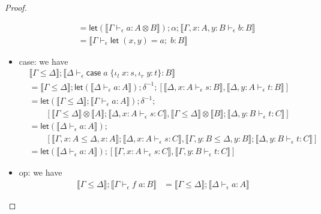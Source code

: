 \documentclass[acmsmall,screen,review]{acmart}
\newcommand{\ms}[1]{\ensuremath{\mathsf{#1}}}
\newcommand{\lto}{:}
\newcommand{\linl}[1]{\iota_l\;{#1}}
\newcommand{\linr}[1]{\iota_r\;{#1}}
\newcommand{\letexpr}[3]{\ensuremath{\ms{let}\;#1 = #2;\;#3}}
\newcommand{\caseexpr}[5]{\ms{case}\;#1\;\{\linl{#2} \lto #3, \linr{#4} \lto #5\}}
\newcommand{\bhyp}[2]{#1 : #2}
\newcommand{\hasty}[4]{#1 \vdash_{#2} #3: {#4}}
\newcommand{\brle}[1]{{\textsf{#1}}}
\newcommand{\dnt}[1]{\llbracket{#1}\rrbracket}
\newcommand{\lmor}[1]{\ms{let}(#1)}
\begin{document}
\begin{proof}
\begin{itemize}
\begin{equation}
\begin{aligned}
        & = \lmor{\dnt{\hasty{\Gamma}{\epsilon}{a}{A \otimes B}}}
          ; \alpha
          ; \dnt{\hasty{\Gamma, \bhyp{x}{A}, \bhyp{y}{B}}{\epsilon}{b}{B}} \\
        & = \dnt{\hasty{\Gamma}{\epsilon}{\letexpr{(x, y)}{a}{b}}{B}}
      \end{aligned}
    \end{equation}
    \item \brle{case}: we have
    \begin{equation}
      \begin{aligned}
        & \dnt{\Gamma \leq \Delta} ; \dnt{\hasty{\Delta}{\epsilon}{\caseexpr{a}{x}{s}{y}{t}}{B}} \\
        & = \dnt{\Gamma \leq \Delta} 
          ; \lmor{\dnt{\hasty{\Delta}{\epsilon}{a}{A}}}
          ; \delta^{-1}
          ; [\dnt{\hasty{\Delta, \bhyp{x}{A}}{\epsilon}{s}{B}}, 
             \dnt{\hasty{\Delta, \bhyp{y}{A}}{\epsilon}{t}{B}}] \\
        & = \lmor{\dnt{\Gamma \leq \Delta} ; \dnt{\hasty{\Gamma}{\epsilon}{a}{A}}}
          ; \delta^{-1}
          ; \\ & \qquad [
              \dnt{\Gamma \leq \Delta} \otimes \dnt{A} 
                ; \dnt{\hasty{\Delta, \bhyp{x}{A}}{\epsilon}{s}{C}},
              \dnt{\Gamma \leq \Delta} \otimes \dnt{B} 
                ; \dnt{\hasty{\Delta, \bhyp{y}{B}}{\epsilon}{t}{C}}
             ] \\
        & = \lmor{\dnt{\hasty{\Delta}{\epsilon}{a}{A}}}
          ; \\ & \qquad [
            \dnt{\Gamma, \bhyp{x}{A} \leq \Delta, \bhyp{x}{A}} 
              ; \dnt{\hasty{\Delta, \bhyp{x}{A}}{\epsilon}{s}{C}},
            \dnt{\Gamma, \bhyp{y}{B} \leq \Delta, \bhyp{y}{B}}
              ; \dnt{\hasty{\Delta, \bhyp{y}{B}}{\epsilon}{t}{C}}
           ] \\
        & = \lmor{\dnt{\hasty{\Delta}{\epsilon}{a}{A}}}
          ; [
            \dnt{\hasty{\Gamma, \bhyp{x}{A}}{\epsilon}{s}{C}},
            \dnt{\hasty{\Gamma, \bhyp{y}{B}}{\epsilon}{t}{C}}
           ]
      \end{aligned}
    \end{equation}
    \item \brle{op}: we have
    \begin{equation}
      \begin{aligned}
        \dnt{\Gamma \leq \Delta} ; \dnt{\hasty{\Gamma}{\epsilon}{f\;a}{B}} 
        & = \dnt{\Gamma \leq \Delta} 
          ; \dnt{\hasty{\Delta}{\epsilon}{a}{A}} 

\end{aligned}
\end{equation}
\end{itemize}
\end{proof}
\end{document}
